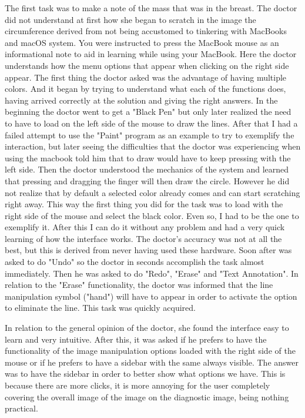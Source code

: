 The first task was to make a note of the mass that was in the breast. The doctor did not understand at first how she began to scratch in the image the circumference derived from not being accustomed to tinkering with MacBooks and macOS system. You were instructed to press the MacBook mouse as an informational note to aid in learning while using your MacBook. Here the doctor understands how the menu options that appear when clicking on the right side appear. The first thing the doctor asked was the advantage of having multiple colors. And it began by trying to understand what each of the functions does, having arrived correctly at the solution and giving the right answers. In the beginning the doctor went to get a "Black Pen" but only later realized the need to have to load on the left side of the mouse to draw the lines. After that I had a failed attempt to use the "Paint" program as an example to try to exemplify the interaction, but later seeing the difficulties that the doctor was experiencing when using the macbook told him that to draw would have to keep pressing with the left side. Then the doctor understood the mechanics of the system and learned that pressing and dragging the finger will then draw the circle. However he did not realize that by default a selected color already comes and can start scratching right away. This way the first thing you did for the task was to load with the right side of the mouse and select the black color. Even so, I had to be the one to exemplify it. After this I can do it without any problem and had a very quick learning of how the interface works. The doctor's accuracy was not at all the best, but this is derived from never having used these hardware. Soon after was asked to do "Undo" so the doctor in seconds accomplish the task almost immediately. Then he was asked to do "Redo", "Erase" and "Text Annotation". In relation to the "Erase" functionality, the doctor was informed that the line manipulation symbol ("hand") will have to appear in order to activate the option to eliminate the line. This task was quickly acquired.

In relation to the general opinion of the doctor, she found the interface easy to learn and very intuitive. After this, it was asked if he prefers to have the functionality of the image manipulation options loaded with the right side of the mouse or if he prefers to have a sidebar with the same always visible. The answer was to have the sidebar in order to better show what options we have. This is because there are more clicks, it is more annoying for the user completely covering the overall image of the image on the diagnostic image, being nothing practical.

